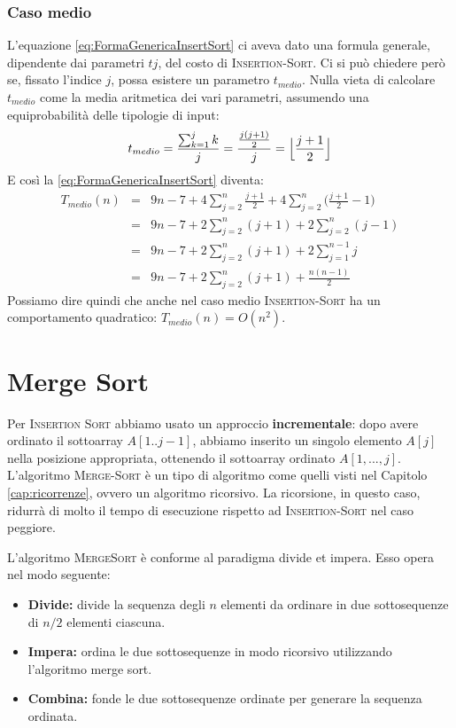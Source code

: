 \subsubsection{Caso medio}
L'equazione \ref{eq:FormaGenericaInsertSort} ci aveva dato una formula generale, dipendente dai parametri $t{j}$, del costo di \textsc{Insertion-Sort}. Ci si può chiedere però se, fissato l'indice $j$, possa esistere un parametro $t_{medio}$. Nulla vieta di calcolare $t_{medio}$ come la media aritmetica dei vari parametri, assumendo una equiprobabilità delle tipologie di input:
\begin{displaymath}
	t_{medio}=\frac{\sum_{k=1}^{j}k}{j}=\frac{\frac{j(j+1)}{2}}{j}=\Bigl \lfloor \frac{j+1}{2}\Bigl \rfloor
\end{displaymath}
E così la \ref{eq:FormaGenericaInsertSort} diventa:
\begin{eqnarray}
	T_{medio}(n)&=& 9n-7+4\sum_{j=2}^{n}\frac{j+1}{2}+4\sum_{j=2}^{n}\bigl(\frac{j+1}{2}-1\bigl)\nonumber \\
	&=& 9n-7+2\sum_{j=2}^{n}(j+1)+2\sum_{j=2}^{n}(j-1)\nonumber \\
	&=& 9n-7+2\sum_{j=2}^{n}(j+1)+2\sum_{j=1}^{n-1}j \nonumber\\
	&=& 9n-7+2\sum_{j=2}^{n}(j+1)+\frac{n(n-1)}{2}
\end{eqnarray}
Possiamo dire quindi che anche nel caso medio \textsc{Insertion-Sort} ha un comportamento quadratico: $T_{medio}(n)=O(n^{2})$.

\section{Merge Sort}
Per \textsc{Insertion Sort} abbiamo usato un approccio \textbf{incrementale}: dopo avere ordinato il sottoarray $A[1..j-1]$, abbiamo inserito un singolo elemento $A[j]$ nella posizione appropriata, ottenendo il sottoarray ordinato $A[1,...,j]$. L'algoritmo \textsc{Merge-Sort} è un tipo di algoritmo come quelli visti nel Capitolo \ref{cap:ricorrenze}, ovvero un algoritmo ricorsivo. La ricorsione, in questo caso, ridurrà di molto il tempo di esecuzione rispetto ad \textsc{Insertion-Sort} nel caso peggiore.


L'algoritmo \textsc{MergeSort} è conforme al paradigma divide et impera. Esso opera nel modo seguente:
\begin{itemize}
	\item \textbf{Divide:} divide la sequenza degli $n$ elementi da ordinare in due sottosequenze di $n/2$ elementi ciascuna.
	\item \textbf{Impera:} ordina le due sottosequenze in modo ricorsivo utilizzando l'algoritmo merge sort.
	\item \textbf{Combina:} fonde le due sottosequenze ordinate per generare la sequenza ordinata.
\end{itemize}

